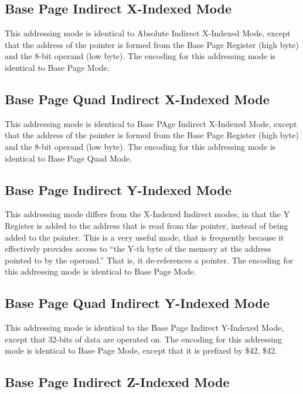 \subsection{Base Page Indirect X-Indexed Mode}

This addressing mode is identical to Absolute Indirect X-Indexed Mode, except that the address
of the pointer is formed from the Base Page Register (high byte) and the 8-bit operand (low byte).
The encoding for this addressing mode is identical to Base Page Mode.

\subsection{Base Page Quad Indirect X-Indexed Mode}

This addressing mode is identical to Base PAge Indirect X-Indexed Mode, except that the address
of the pointer is formed from the Base Page Register (high byte) and the 8-bit operand (low byte).
The encoding for this addressing mode is identical to Base Page Quad Mode.

\subsection{Base Page Indirect Y-Indexed Mode}

This addressing mode differs from the X-Indexed Indirect modes, in that the Y Register is
added to the address that is read from the pointer, instead of being added to the pointer.
This is a very useful mode, that is frequently because it effectively provides access to
``the Y-th byte of the memory at the address pointed to by the operand.'' That is, it de-references
a pointer.
The encoding for this addressing mode is identical to Base Page Mode.

\subsection{Base Page Quad Indirect Y-Indexed Mode}

This addressing mode is identical to the Base Page Indirect Y-Indexed Mode, except that
32-bits of data are operated on. The encoding for this addressing mode is identical to
Base Page Mode, except that it is prefixed by \$42, \$42.

\subsection{Base Page Indirect Z-Indexed Mode}

